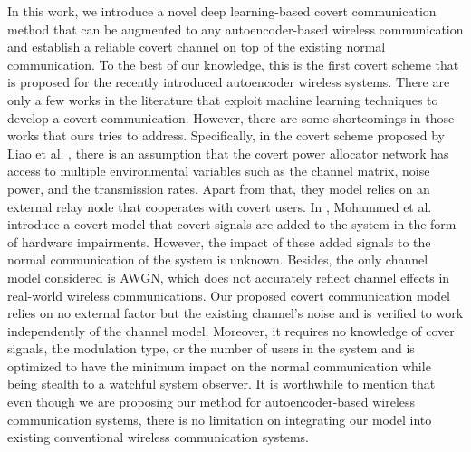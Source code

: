 In this work, we introduce a novel deep learning-based covert communication method that can be augmented to any autoencoder-based wireless communication and establish a reliable covert channel on top of the existing normal communication. To the best of our knowledge, this is the first covert scheme that is proposed for the recently introduced autoencoder wireless systems. There are only a few works in the literature that exploit machine learning techniques to develop a covert communication. However, there are some shortcomings in those works that ours tries to address. Specifically, in the covert scheme proposed by Liao et al. \cite{liao2020generative}, there is an assumption that the covert power allocator network has access to multiple environmental variables such as the channel matrix, noise power, and the transmission rates. Apart from that, they model relies on an external relay node that cooperates with covert users. In \cite{mohammed2021adversarial}, Mohammed et al. introduce a covert model that covert signals are added to the system in the form of hardware impairments. However, the impact of these added signals to the normal communication of the system is unknown. Besides, the only channel model considered is AWGN, which does not accurately reflect channel effects in real-world wireless communications. Our proposed covert communication model relies on no external factor but the existing channel's noise and is verified to work independently of the channel model. Moreover, it requires no knowledge of cover signals, the modulation type, or the number of users in the system and is optimized to have the minimum impact on the normal communication while being stealth to a watchful system observer. It is worthwhile to mention that even though we are proposing our method for autoencoder-based wireless communication systems, there is no limitation on integrating our model into existing conventional wireless communication systems.


